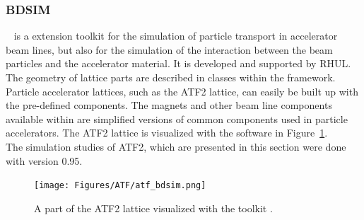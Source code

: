 \subsubsection{BDSIM}
\label{BDSIM}
\bdsim~\cite{BDSIM} is a \geant extension toolkit for the simulation of particle transport in accelerator beam lines, but also for the simulation of the interaction between the beam particles and the accelerator material. 
It is developed and supported by RHUL.
The geometry of lattice parts are described in classes within the \bdsim framework. 
Particle accelerator lattices, such as the ATF2 lattice, can easily be built up with the pre-defined components. 
The magnets and other beam line components available within \bdsim are simplified versions of common components used in particle accelerators. 
The ATF2 lattice is visualized with the \bdsim software in Figure~\ref{fig:ATF2_BDSIM}.
\\The simulation studies of ATF2, which are presented in this section were done with \bdsim version 0.95.
\begin{figure}[!h]
\centering
\texttt{[image: Figures/ATF/atf\_bdsim.png]}
\caption[ATF2 lattice in \bdsim]{A part of the ATF2 lattice visualized with the \geant toolkit \bdsim.}
\label{fig:ATF2_BDSIM}
\end{figure}


